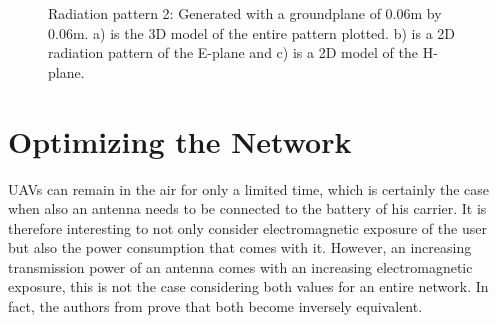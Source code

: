 \begin{figure}[!htb]
\caption{Radiation pattern 2: Generated with a groundplane of 0.06m by 0.06m. a) is the 3D model of the entire pattern plotted. b) is a 2D radiation pattern of the E-plane and c) is a 2D model of the H-plane.}
 \label{radpattern1}
\end{figure}

\section{Optimizing the Network}
\label{sec:methodology:optimizingTheNetwork}

\gls{UAV}s can remain in the air for only a limited time, which is certainly 
the case when also an antenna needs to be connected to the battery of his carrier. It is therefore
interesting to not only consider electromagnetic exposure of the user but also the power consumption that comes with it. 
However, an increasing transmission power of an antenna comes with an increasing electromagnetic exposure, this is not the case considering
both values for an entire network. In fact, the authors from \cite{J1}  prove that both become inversely equivalent.


